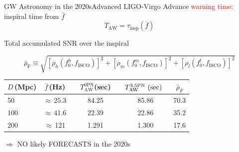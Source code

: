 \documentclass[xcolor=dvipsnames,t]{beamer}
\newcommand{\red}[1]{\textcolor{red}{#1}}
\newcommand\T{\rule{0pt}{2.6ex}}       %
\newcommand\B{\rule[-1.2ex]{0pt}{0pt}} %
\begin{document}
\begin{frame}{GW Astronomy in the 2020s}{Advanced LIGO-Virgo}
  Advance \red{warning time}: inspiral time from $\bar{f}$
  \[
    T_\text{AW} = \tau_\text{insp}(\bar{f})
  \]
  {
    Total accumulated SNR over the inspiral
    \begin{footnotesize}
      \[
      \bar{\rho}_\text{F}\equiv\sqrt{\left[{\rho}_h(f_0^h,{f}_\text{ISCO})\right]^2+\left[{\rho}_m(f_0^m,{f}_\text{ISCO})\right]^2+\left[{\rho}_l(f_0^l,{f}_\text{ISCO})\right]^2}
      \]
      \begin{table}[h]
	\centering
	\begin{tabular}{lcccccc}
	  \hline\hline
	  $D\,$(Mpc) & $\bar{f}\,$(Hz) &{}& $T^\text{0PN}_\text{AW}$(sec) &\hspace{1mm} & $T^\text{3.5PN}_\text{AW}\text{ (sec)}\hspace{2mm}$& $\bar{\rho}_F$\T \B \\
	  \hline
	  50 & $\approx\,$25.3 & & 84.25 & & 85.86 & 70.3 \\
	  100 & $\approx\,$41.6 & & 22.39 & & 22.86 & 35.2 \\
	  200 & $\approx\,$121 & & 1.291 &\quad & 1.300 & 17.6 \\
	  \hline\hline
	\end{tabular}
      \end{table}
    \end{footnotesize}
  }
%
$\Longrightarrow$ NO likely FORECASTS  in the 2020s

\end{frame}
\end{document}
